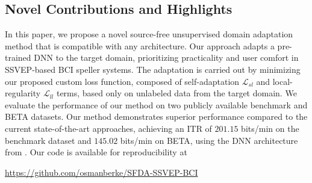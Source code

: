 \documentclass[12pt]{iopart}
\begin{document}
\subsection{Novel Contributions and Highlights}\label{sec:novel}
{In this paper, we propose a novel source-free unsupervised domain adaptation method that is compatible with any architecture. Our approach adapts a pre-trained DNN to the target domain, prioritizing practicality and user comfort in SSVEP-based BCI speller systems.} The adaptation is carried out by minimizing our proposed custom loss function, composed of self-adaptation $\mathcal{L}_{sl}$ and local-regularity $\mathcal{L}_{{ll}}$ terms, based only on unlabeled data from the target domain. We evaluate the performance of our method on two publicly available benchmark \cite{benchmark_Dataset} and BETA \cite{beta} datasets. Our method demonstrates superior performance compared to the current state-of-the-art approaches, achieving an ITR of $201.15$ bits/min on the benchmark dataset \cite{benchmark_Dataset} and $145.02$ bits/min on BETA, using the DNN architecture from \cite{ournetwork}. Our code is available for reproducibility at 


\noindent
\url{https://github.com/osmanberke/SFDA-SSVEP-BCI}
\end{document}
